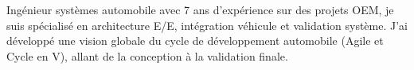 %
%
%
\par{
Ingénieur systèmes automobile avec 7 ans d'expérience sur des projets OEM, je suis spécialisé en architecture E/E, intégration véhicule et validation système. J'ai développé une vision globale du cycle de développement automobile (Agile et Cycle en V), allant de la conception à la validation finale.
}